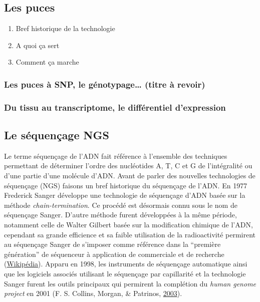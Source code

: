 \documentclass[12pt,twoside]{reedthesis}
\providecommand{\tightlist}{%
  \setlength{\itemsep}{0pt}\setlength{\parskip}{0pt}}
\theoremstyle{definition}
\theoremstyle{definition}
\theoremstyle{remark}
\begin{document}
  \subsection{Les puces}\label{les-puces}
  
  \begin{enumerate}
  \def\labelenumi{\arabic{enumi}.}
  \tightlist
  \item
    Bref historique de la technologie\\
  \item
    A quoi ça sert
  \item
    Comment ça marche
  \end{enumerate}
  
  \subsubsection{Les puces à SNP, le génotypage\ldots{} (titre à
  revoir)}\label{les-puces-a-snp-le-genotypage-titre-a-revoir}
  
  \subsubsection{Du tissu au transcriptome, le différentiel
  d'expression}\label{du-tissu-au-transcriptome-le-differentiel-dexpression}
  
  \subsection{Le séquençage NGS}\label{ngs}
  
  Le terme séquençage de l'ADN fait référence à l'ensemble des techniques
  permettant de déterminer l'ordre des nucléotides A, T, C et G de
  l'intégralité ou d'une partie d'une molécule d'ADN. Avant de parler des
  nouvelles technologies de séquençage (NGS) faisons un bref historique du
  séquençage de l'ADN. En 1977 Frederick Sanger développe une technologie
  de séquençage d'ADN basée sur la méthode \emph{chain-termination}. Ce
  procédé est désormais connu sous le nom de séquençage Sanger. D'autre
  méthode furent développées à la même période, notamment celle de Walter
  Gilbert basée sur la modification chimique de l'ADN, cependant sa grande
  efficience et sa faible utilisation de la radioactivité permirent au
  séquençage Sanger de s'imposer comme référence dans la ``première
  génération'' de séquenceur à application de commerciale et de recherche
  (\href{http://en.wikipedia.org/wiki/DNA_sequencing}{Wikipédia}). Apparu
  en 1998, les instruments de séquençage automatique ainsi que les
  logiciels associés utilisant le séquençage par capillarité et la
  technologie Sanger furent les outils principaux qui permirent la
  complétion du \emph{human genome project} en 2001 (F. S. Collins,
  Morgan, \& Patrinos, \protect\hyperlink{ref-Collins2003}{2003}).
  
\end{document}
